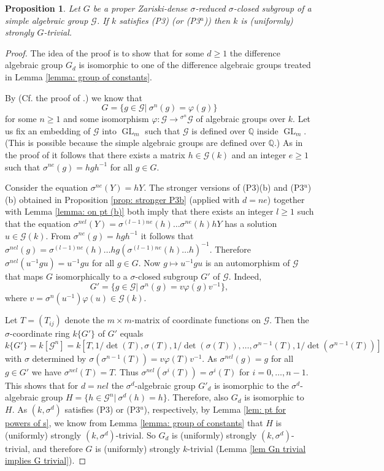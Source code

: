 \documentclass[oneside,reqno]{amsart}
\newtheorem{prop}[theo]{Proposition}
\theoremstyle{definition}
\newcommand{\G}{\mathcal{G}}
\newcommand{\Gl}{\operatorname{GL}}
\newcommand{\s}{\sigma}
\newcommand{\pt}{{\rm{(P3$^u$)}}}
\newcommand{\ptweak}{{\rm{(P3)}}}
\begin{document}
\begin{prop} \label{prop: Zariski dense in simple}
Let $G$ be a proper Zariski-dense $\s$-reduced $\s$-closed subgroup of a simple algebraic group $\G$. If $k$ satisfies \ptweak{} (or \pt{}) then $k$ is (uniformly) strongly $G$-trivial.
\end{prop}
\begin{proof}
	The idea of the proof is to show that for some $d\geq 1$ the difference algebraic group $G_d$ is isomorphic to one of the difference algebraic groups treated in Lemma \ref{lemma: group of constants}.
	
	By \cite[Prop. A.19]{DiVizioHardouinWibmer:DifferenceAlgebraicRelations} (Cf. the proof of  \cite[Prop. 7.10)]{ChatzidakiHrushovskiPeterzil:ModelTheoryofDifferenceFieldsIIPeriodicIdelas}.) we know that 
	$$G=\{g\in\G|\ \s^n(g)=\varphi(g)\}$$
	for some $n\geq 1$ and some isomorphism $\varphi\colon\G\to {^{\s^n}\!\G}$ of algebraic groups over $k$.
	Let us fix an embedding of $\G$ into $\Gl_m$ such that $\G$ is defined over $\mathbb{Q}$ inside $\Gl_m$. (This is possible because the simple algebraic groups are defined over $\mathbb{Q}$.) 
	As in the proof of \cite[Theorem A.20]{DiVizioHardouinWibmer:DifferenceAlgebraicRelations} it follows that there exists a matrix $h\in\G(k)$ and an integer $e\geq 1$ such that
	$\s^{ne}(g)=hgh^{-1}$ for all $g\in G$. 
	
	Consider the equation $\s^{ne}(Y)=hY$. The stronger versions of \ptweak{}(b) and \pt{}(b) obtained in Proposition \ref{prop: stronger P3b} (applied with $d=ne$) together with Lemma \ref{lemma: on pt (b)} both imply that there exists an integer $l\geq 1$ such that the equation $\s^{nel}(Y)=\s^{(l-1)ne}(h)\ldots\s^{ne}(h)hY$ has a solution $u\in\G(k)$. From $\s^{ne}(g)=hgh^{-1}$  it follows that $\s^{nel}(g)=\s^{(l-1)ne}(h)\ldots h g (\s^{(l-1)ne}(h)\ldots h)^{-1}$. Therefore 
	$\s^{nel}(u^{-1}gu)=u^{-1}gu$ for all $g\in G$. Now
	$g\mapsto u^{-1}gu$ is an automorphism of $\G$ that maps $G$ isomorphically to a $\s$-closed subgroup $G'$ of $\G$. Indeed,
	$$G'=\{g\in \G|\ \s^n(g)=v\varphi(g)v^{-1}\},$$
	where $v=\s^n(u^{-1})\varphi(u)\in\G(k)$.


	Let $T=(T_{ij})$ denote the $m\times m$-matrix of coordinate functions on $\G$. Then the $\s$-coordinate ring $k\{G'\}$ of $G'$ equals $$k\{G'\}=k[\G^n]=k[T,1/\det(T),\s(T),1/\det(\s(T)),\ldots,\s^{n-1}(T),1/\det(\s^{n-1}(T))]$$ with $\s$ determined by $\s(\s^{n-1}(T))=v\varphi(T)v^{-1}$.  
	As $\s^{nel}(g)=g$ for all $g\in G'$ we have $\s^{nel}(T)=T$. Thus $\s^{nel}(\s^i(T))=\s^i(T)$ for $i=0,\ldots,n-1$. This shows that for $d=nel$ the $\s^d$-algebraic group $G'_d$ is isomorphic to
	the $\s^d$-algebraic group $H=\{h\in\G^n|\ \s^d(h)=h\}$.
	Therefore, also $G_d$ is isomorphic to $H$. As $(k,\s^d)$ satisfies \ptweak{} or \pt{}, respectively, by Lemma \ref{lem: pt for powers of s}, we know from Lemma \ref{lemma: group of constants} that $H$ is (uniformly) strongly $(k,\s^d)$-trivial. So $G_d$ is (uniformly) strongly $(k,\s^d)$-trivial, and therefore $G$ is (uniformly) strongly $k$-trivial (Lemma \ref{lem Gn trivial implies G trivial}).		
\end{proof}
\end{document}
